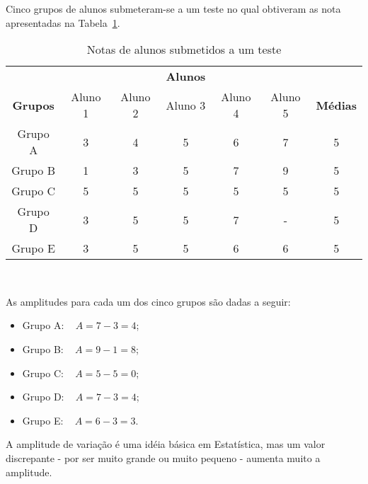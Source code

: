 \documentclass[11pt,fleqn]{book} %
\begin{document}
\vspace{0,3cm}


\begin{example}

Cinco grupos de alunos submeteram-se a um teste no qual obtiveram as nota apresentadas na Tabela~\ref{tab:notasalunos}.

\begin{table}[h]
	\caption{Notas de alunos submetidos a um teste}
	\label{tab:notasalunos} 
	\vspace{-0.1cm}
	\centering
	\begin{tabular}{c | c c c c c | c}
	\toprule
	& & & {\bf Alunos} & & & \\
	\cmidrule(lr){2-6}
	{\bf Grupos} & Aluno 1 & Aluno 2 & Aluno 3 & Aluno 4 & Aluno 5 & {\bf Médias} \\
	\midrule
	Grupo A & 3 & 4 & 5 & 6 & 7 & 5 \\
	Grupo B & 1 & 3 & 5 & 7 & 9 & 5 \\
	Grupo C & 5 & 5 & 5 & 5 & 5 & 5 \\
	Grupo D & 3 & 5 & 5 & 7 & - & 5 \\
	Grupo E & 3 & 5 & 5 & 6 & 6 & 5 \\
	\bottomrule
	\end{tabular} \\
\end{table}

As amplitudes para cada um dos cinco grupos são dadas a seguir: \\

\begin{itemize}

\item Grupo A: \,\,\, $A=7-3=4$;
\item Grupo B: \,\,\, $A=9-1=8$;
\item Grupo C: \,\,\, $A=5-5=0$;
\item Grupo D: \,\,\, $A=7-3=4$;
\item Grupo E: \,\,\, $A=6-3=3$. \\


\end{itemize}

\end{example}

\vspace{0,3cm}

A amplitude de variação é uma idéia básica em Estatística, mas um valor discrepante - por ser muito grande ou muito pequeno - aumenta muito a amplitude.
\end{document}
